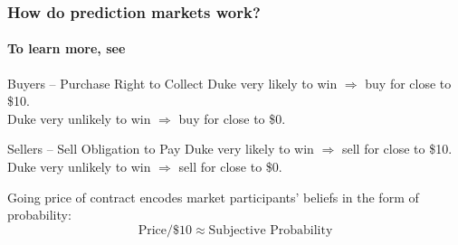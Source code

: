 \documentclass[handout]{beamer}
\begin{document}
\begin{frame}

\frametitle{How do prediction markets work?}
\framesubtitle{To learn more, see }
\begin{center}
\vspace{1em}
\pause
\begin{block}{Buyers -- Purchase Right to Collect}\pause
Duke very likely to win $\Rightarrow$ buy for close to \$10. \pause \\Duke very unlikely to win $\Rightarrow$ buy for close to \$0. \pause
\end{block}

\begin{block}{Sellers -- Sell Obligation to Pay} \pause
Duke very likely to win $\Rightarrow$ sell for close to \$10. \pause \\Duke very unlikely to win $\Rightarrow$ sell for close to \$0.
\end{block}
\end{center}

\end{frame}
\begin{frame}

\Large Going price of contract encodes market participants' beliefs in the form of probability:
\Large\\ 
$$\mbox{Price}/\$10 \approx \mbox{Subjective Probability}$$


\end{frame}
\end{document}
